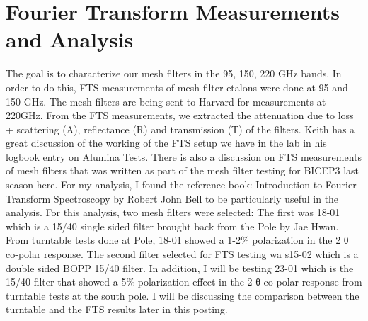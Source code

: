 \documentclass[12pt]{article}
\begin{document}
\section{Fourier Transform Measurements and Analysis}
The goal is to characterize our mesh filters in the 95, 150, 220 GHz bands. In order to do this, FTS measurements of mesh filter etalons were done at 95 and 150 GHz. The mesh filters are being sent to Harvard for measurements at 220GHz. From the FTS measurements, we extracted the attenuation due to loss + scattering (A), reflectance (R) and transmission (T) of the filters. Keith has a great discussion of the working of the FTS setup we have in the lab in his logbook entry on Alumina Tests. There is also a discussion on FTS measurements of mesh filters that was written as part of the mesh filter testing for BICEP3 last season here. For my analysis, I found the reference book: Introduction to Fourier Transform Spectroscopy by Robert John Bell to be particularly useful in the analysis.
For this analysis, two mesh filters were selected: The first was 18-01 which is a 15/40 single sided filter brought back from the Pole by Jae Hwan. From turntable tests done at Pole, 18-01 showed a 1-2\% polarization in the 2 θ co-polar response. The second filter selected for FTS testing wa s15-02 which is a double sided BOPP 15/40 filter. In addition, I will be testing 23-01 which is the 15/40 filter that showed a 5\% polarization effect in the 2 θ co-polar response from turntable tests at the south pole. I will be discussing the comparison between the turntable and the FTS results later in this posting.
\end{document}
